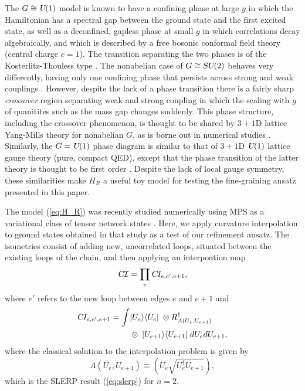 \documentclass[twocolumn,lengthcheck,superscriptaddress]{revtex4-1}
\def\su2{\textsl{SU}(2)}
\def\uone{\textsl{U}(1)}
\theoremstyle{definition}
\theoremstyle{remark}
\begin{document}
The $G \cong \uone$ model is known to have a confining phase at large $g$ in which the Hamiltonian has a spectral gap between the ground state and the first excited state, as well as a deconfined, gapless phase at small $g$ in which correlations decay algebraically, and which is described by a free bosonic conformal field theory (central charge $c=1$). The transition separating the two phases is of the Kosterlitz-Thouless type \cite{sachdev:2011a}. The nonabelian case of $G \cong \su2$ behaves very differently, having only one confining phase that persists across strong and weak couplings \cite{sachdev:2011a}. However, despite the lack of a phase transition there is a fairly sharp \emph{crossover} region separating weak and strong coupling in which the scaling with $g$ of quanitites such as the mass gap changes suddenly. This phase structure, including the crossover phenomenon, is thought to be shared by $3+1$D lattice Yang-Mills theory for nonabelian $G$, as is borne out in numerical studies \cite{creutz:1985a}. Similarly, the $G = \uone$ phase diagram is similar to that of $3+1$D $\uone$ lattice gauge theory (pure, compact QED), except that the phase transition of the latter theory is thought to be first order \cite{arnold:2003a}. Despite the lack of local gauge symmetry, these similarities make $H_R$ a useful toy model for testing the fine-graining ansatz presented in this paper.

The model (\ref{eq:H_R}) was recently studied numerically using MPS as a variational class of tensor network states \cite{milsted:2015a}. Here, we apply curvature interpolation to ground states obtained in that study as a test of our refinement ansatz. The isometries consist of adding new, uncorrelated loops, situated between the existing loops of the chain, and then applying an interpoation map 
\begin{equation} \label{eq:interp_R}
  \textsl{C}\mathcal{I} = \prod_{e} \textsl{C}I_{e,e',e + 1},
\end{equation}
where $e'$ refers to the new loop between edges $e$ and $e + 1$ and 
\begin{align}
  \textsl{C}I_{e,e',e + 1} = \int &|U_e\rangle \langle U_e | \;  \otimes R^\dagger_{A(U_e, U_{e+1})} \\
                        &\otimes \; |U_{e+1}\rangle \langle U_{e+1}| \; dU_e dU_{e+1}, \nonumber
\end{align}
where the classical solution to the interpolation problem is given by 
\begin{equation}
  A(U_e, U_{e+1}) \equiv  \left(U_e \sqrt{U_e^\dagger U_{e+1}} \right),
\end{equation}
which is the SLERP result (\ref{eq:slerp}) for $n=2$.
\end{document}
